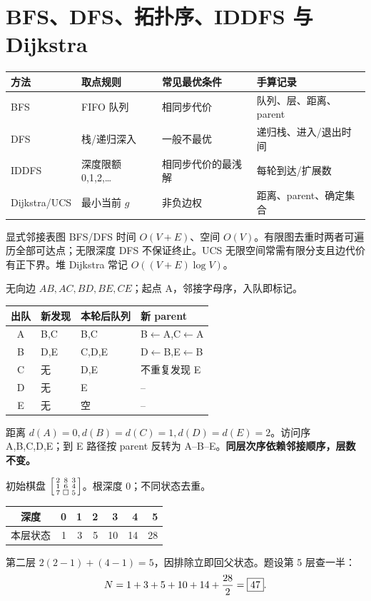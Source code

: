 \section{BFS、DFS、拓扑序、IDDFS 与 Dijkstra}\label{sec:search}
\par\noindent\begin{tabularx}{\textwidth}{lYYY}
\toprule 方法 & 取点规则 & 常见最优条件 & 手算记录\\\midrule
BFS & FIFO 队列 & 相同步代价 & 队列、层、距离、parent\\
DFS & 栈/递归深入 & 一般不最优 & 递归栈、进入/退出时间\\
IDDFS & 深度限额 0,1,2,… & 相同步代价的最浅解 & 每轮到达/扩展数\\
Dijkstra/UCS & 最小当前 $g$ & 非负边权 & 距离、parent、确定集合\\\bottomrule
\end{tabularx}\par
显式邻接表图 BFS/DFS 时间 $O(V+E)$、空间 $O(V)$。有限图去重时两者可遍历全部可达点；无限深度 DFS 不保证终止。UCS 无限空间常需有限分支且边代价有正下界。堆 Dijkstra 常记 $O((V+E)\log V)$。

无向边 $AB,AC,BD,BE,CE$；起点 A，邻接字母序，入队即标记。
\begin{center}\begin{tabular}{c|l|l|l}\toprule
出队&新发现&本轮后队列&新 parent\\\midrule
A&B,C&B,C&B$\leftarrow$A,C$\leftarrow$A\\
B&D,E&C,D,E&D$\leftarrow$B,E$\leftarrow$B\\
C&无&D,E&不重复发现 E\\D&无&E&--\\E&无&空&--\\\bottomrule
\end{tabular}\end{center}
距离 $d(A)=0,d(B)=d(C)=1,d(D)=d(E)=2$。访问序 A,B,C,D,E；到 E 路径按 parent 反转为 A--B--E。\textbf{同层次序依赖邻接顺序，层数不变。}

初始棋盘 $\left[\begin{smallmatrix}2&8&3\\1&6&4\\7&\square&5\end{smallmatrix}\right]$。根深度 0；不同状态去重。
\begin{center}\begin{tabular}{c|rrrrrr}\toprule
深度&0&1&2&3&4&5\\\midrule
本层状态&1&3&5&10&14&28\\\bottomrule
\end{tabular}\end{center}
第二层 $2(2-1)+(4-1)=5$，因排除立即回父状态。题设第 5 层查一半：
\[
N=1+3+5+10+14+\frac{28}{2}=\boxed{47}.
\]

